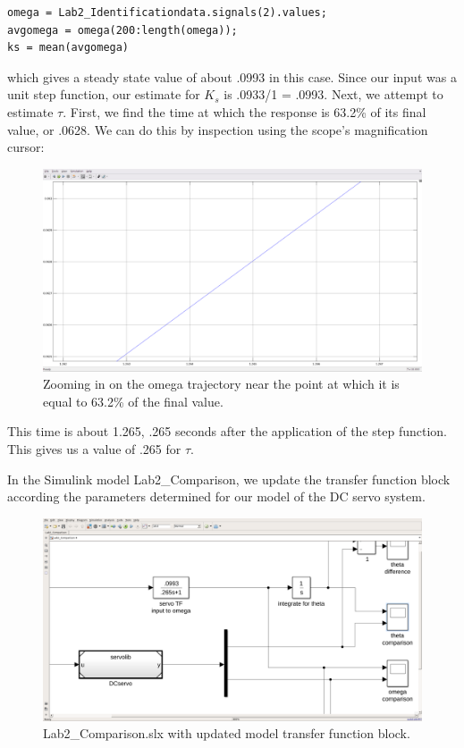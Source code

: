 \documentclass[11pt,a4paper]{article}
\begin{document}
\begin{verbatim}
omega = Lab2_Identificationdata.signals(2).values;
avgomega = omega(200:length(omega));
ks = mean(avgomega)
\end{verbatim}

which gives a steady state value of about .0993 in this case. Since our input was a unit step function, our estimate for $K_{s}$ is .0933/1 = .0993. Next, we attempt to estimate $\tau$. First, we find the time at which the response is 63.2\% of its final value, or .0628. We can do this by inspection using the scope's magnification cursor:

\begin{figure}[here]
\includegraphics[width=\textwidth]{imglab/lab2sol_identification2white.png}
\caption{Zooming in on the omega trajectory near the point at which it is equal to 63.2\% of the final value. }
\label{fig:id2}
\end{figure}

This time is about 1.265, .265 seconds after the application of the step function. This gives us a value of .265 for $\tau$.

In the Simulink model Lab2\_Comparison, we update the transfer function block according the parameters determined for our model of the DC servo system.

\begin{figure}[here]
\includegraphics[width=\textwidth]{imglab/lab2sol_comp1.png}
\caption{Lab2\_Comparison.slx with updated model transfer function block. }
\label{fig:comp1}
\end{figure}
\end{document}
